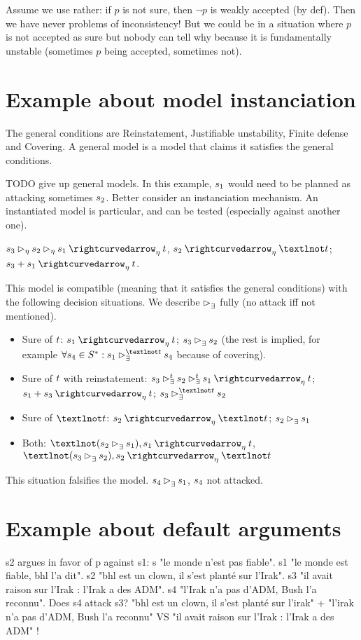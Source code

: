 \documentclass[version=last, pagesize, twoside=semi, DIV=calc, bibliography=totoc, 12pt, a4paper, french, english]{scrartcl}
\begin{document}
Assume we use rather: if $p$ is not sure, then $¬p$ is weakly accepted (by def). Then we have never problems of inconsistency! But we could be in a situation where $p$ is not accepted as sure but nobody can tell why because it is fundamentally unstable (sometimes $p$ being accepted, sometimes not).

\section{Example about model instanciation}
The general conditions are Reinstatement, Justifiable unstability, Finite defense and Covering.
A general model is a model that claims it satisfies the general conditions.

TODO give up general models. In this example, $s_1$ would need to be planned as attacking sometimes $s_2$. Better consider an instanciation mechanism. An instantiated model is particular, and can be tested (especially against another one).
\begin{example}
	$\ar_3 \mbeats \ar_2 \mbeats \ar_1 \mleadsto \prop$, $\ar_2 \mleadsto ¬\prop$; $\ar_3 + \ar_1 \mleadsto \prop$.
\end{example}
This model is compatible (meaning that it satisfies the general conditions) with the following decision situations. We describe $\mathbin{\vartriangleright_\exists^{}}$ fully (no attack iff not mentioned).
\begin{itemize}
	\item Sure of $t$: $\ar_1 \mleadsto \prop$; $s_3 \mathbin{\vartriangleright_\exists^{}} s_2$ (the rest is implied, for example $\forall \ar_4 \in \allargs: \ar_1 \ibeatse[¬\prop] \ar_4$ because of covering).
	\item Sure of $t$ with reinstatement: $\ar_3 \ibeatse[\prop] \ar_2 \ibeatse[\prop] \ar_1 \mleadsto \prop$; $\ar_1 + \ar_3 \mleadsto \prop$; $\ar_3 \ibeatse[¬\prop] \ar_2$
	\item Sure of $¬\prop$: $\ar_2 \mleadsto ¬\prop$; $s_2 \mathbin{\vartriangleright_\exists^{}} s_1$
	\item Both: $¬(\ar_2 \ibeatse \ar_1), \ar_1 \mleadsto \prop$, $¬(\ar_3 \ibeatse \ar_2), \ar_2 \mleadsto ¬\prop$
\end{itemize}
This situation falsifies the model. $s_4 \mathbin{\vartriangleright_\exists^{}} s_1$, $s_4$ not attacked.

\section{Example about default arguments}
s2 argues in favor of p against s1: s "le monde n’est pas fiable". s1 "le monde est fiable, bhl l’a dit". s2 "bhl est un clown, il s’est planté sur l’Irak". s3 "il avait raison sur l’Irak : l’Irak a des ADM". s4 "l’Irak n’a pas d’ADM, Bush l’a reconnu".
Does s4 attack s3?
"bhl est un clown, il s’est planté sur l’irak" + "l’irak n’a pas d’ADM, Bush l’a reconnu" VS "il avait raison sur l’Irak : l’Irak a des ADM" !
\end{document}
